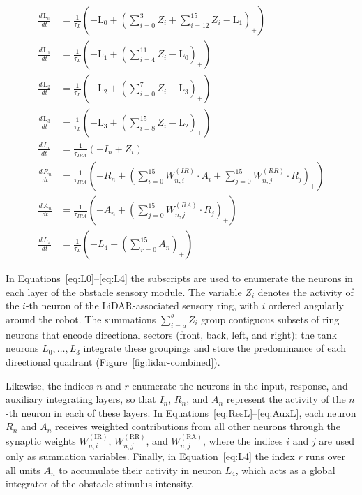 \documentclass[preprint,12pt]{elsarticle}
\begin{document}
\begin{align}
\frac{d\, \text{L}_0}{dt} &= \frac{1}{\tau_{L}} \left( -\text{L}_0 + \left( \sum_{i=0}^{3} Z_i + \sum_{i=12}^{15} Z_i - \text{L}_1 \right)_+ \right)\label{eq:L0}\\
\frac{d\, \text{L}_1}{dt} &= \frac{1}{\tau_{L}} \left( -\text{L}_1 + \left( \sum_{i=4}^{11} Z_i - \text{L}_0 \right)_+ \right)\label{eq:L1}\\
\frac{d\, \text{L}_2}{dt} &= \frac{1}{\tau_{L}} \left( -\text{L}_2 + \left( \sum_{i=0}^{7} Z_i - \text{L}_3 \right)_+ \right)\label{eq:L2}\\
\frac{d\, \text{L}_3}{dt} &= \frac{1}{\tau_{L}} \left( -\text{L}_3 + \left( \sum_{i=8}^{15} Z_i - \text{L}_2 \right)_+ \right)\label{eq:L3}\\
\frac{d\, I_n}{dt} &= \frac{1}{\tau_{IRA}} \left( -I_n + Z_i \right)\label{eq:InputL}\\
\frac{d\, R_n}{dt} &= \frac{1}{\tau_{IRA}} \left( -R_n + \left(\sum_{i=0}^{15} W^{(IR)}_{n,i} \cdot A_i + \sum_{j=0}^{15} W^{(RR)}_{n,j} \cdot R_j \right)_+\right)\label{eq:ResL}\\
\frac{d\, A_n}{dt} &= \frac{1}{\tau_{IRA}} \left( -A_n + \left(\sum_{j=0}^{15} W^{(RA)}_{n,j} \cdot R_j \right)_+ \right)\label{eq:AuxL}\\
\frac{d\, L_4}{dt} &= \frac{1}{\tau_L} \left( -L_4 + \left(\sum_{r=0}^{15} A_n \right) _+\right)\label{eq:L4}
\end{align}

In Equations~\eqref{eq:L0}–\eqref{eq:L4} the subscripts are used to enumerate the neurons in each layer of the obstacle sensory module. The variable $Z_i$ denotes the activity of the $i$-th neuron of the LiDAR-associated sensory ring, with $i$ ordered angularly around the robot. The summations $\sum_{i=a}^{b} Z_i$ group contiguous subsets of ring neurons that encode directional sectors (front, back, left, and right); the tank neurons $L_0,\dots,L_3$ integrate these groupings and store the predominance of each directional quadrant (Figure~\ref{fig:lidar-combined}).

Likewise, the indices $n$ and $r$ enumerate the neurons in the input, response, and auxiliary integrating layers, so that $I_n$, $R_n$, and $A_n$ represent the activity of the $n$-th neuron in each of these layers. In Equations~\eqref{eq:ResL}–\eqref{eq:AuxL}, each neuron $R_n$ and $A_n$ receives weighted contributions from all other neurons through the synaptic weights $W^{(\mathrm{IR})}_{n,i}$, $W^{(\mathrm{RR})}_{n,j}$, and $W^{(\mathrm{RA})}_{n,j}$, where the indices $i$ and $j$ are used only as summation variables. Finally, in Equation~\eqref{eq:L4} the index $r$ runs over all units $A_n$ to accumulate their activity in neuron $L_4$, which acts as a global integrator of the obstacle-stimulus intensity.
\end{document}

